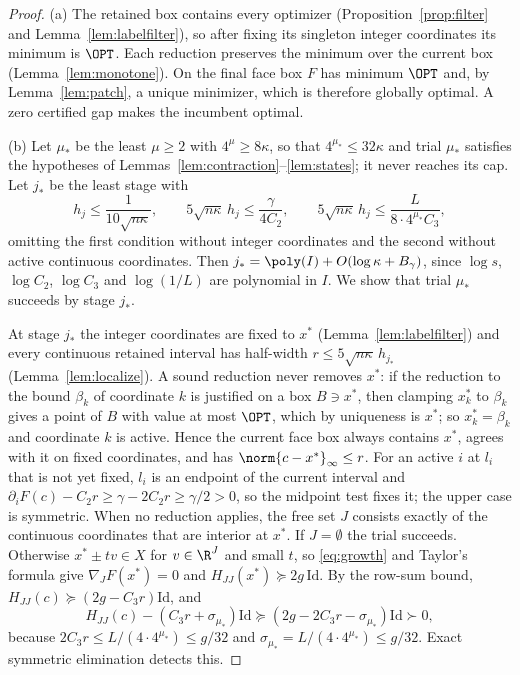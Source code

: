 \begin{proof}
(a) The retained box contains every optimizer
(Proposition~\ref{prop:filter} and Lemma~\ref{lem:labelfilter}), so after
fixing its singleton integer coordinates its minimum is $\OPT$. Each
reduction preserves the minimum over the current box
(Lemma~\ref{lem:monotone}). On the final face box $F$ has minimum $\OPT$ and,
by Lemma~\ref{lem:patch}, a unique minimizer, which is therefore globally
optimal. A zero certified gap makes the incumbent optimal.

(b) Let $\mu_*$ be the least $\mu\ge2$ with $4^\mu\ge8\kappa$, so that
$4^{\mu_*}\le32\kappa$ and trial $\mu_*$ satisfies the hypotheses of
Lemmas~\ref{lem:contraction}--\ref{lem:states}; it never reaches its cap. Let
$j_*$ be the least stage with
\[
h_j\le\frac1{10\sqrt{n\kappa}},\qquad
5\sqrt{n\kappa}\,h_j\le\frac\gamma{4C_2},\qquad
5\sqrt{n\kappa}\,h_j\le\frac L{8\cdot4^{\mu_*}C_3},
\]
omitting the first condition without integer coordinates and the second
without active continuous coordinates. Then
$j_*=\poly(I)+O(\log\kappa+B_\gamma)$, since $\log s$, $\log C_2$, $\log C_3$
and $\log(1/L)$ are polynomial in $I$. We show that trial $\mu_*$ succeeds by
stage $j_*$.

At stage $j_*$ the integer coordinates are fixed to $x^*$
(Lemma~\ref{lem:labelfilter}) and every continuous retained interval has
half-width $r\le5\sqrt{n\kappa}\,h_{j_*}$ (Lemma~\ref{lem:localize}). A sound
reduction never removes $x^*$: if the reduction to the bound $\beta_k$ of
coordinate $k$ is justified on a box $B\ni x^*$, then clamping $x^*_k$ to
$\beta_k$ gives a point of $B$ with value at most $\OPT$, which by uniqueness is
$x^*$; so $x^*_k=\beta_k$ and coordinate $k$ is active. Hence the current
face box always contains $x^*$, agrees with it on fixed coordinates, and has
$\norm{c-x^*}_\infty\le r$. For an active $i$ at $l_i$ that is not yet fixed,
$l_i$ is an endpoint of the current interval and
$\partial_iF(c)-C_2r\ge\gamma-2C_2r\ge\gamma/2>0$, so the midpoint test
fixes it; the upper case is symmetric. When no reduction applies, the free
set $J$ consists exactly of the continuous coordinates that are interior at
$x^*$. If $J=\emptyset$ the trial succeeds. Otherwise $x^*\pm tv\in X$ for
$v\in\R^J$ and small $t$, so \eqref{eq:growth} and Taylor's formula give
$\nabla_JF(x^*)=0$ and $H_{JJ}(x^*)\succeq2g\,\mathrm{Id}$. By the row-sum
bound, $H_{JJ}(c)\succeq(2g-C_3r)\mathrm{Id}$, and
\[
H_{JJ}(c)-(C_3r+\sigma_{\mu_*})\mathrm{Id}\succeq(2g-2C_3r-\sigma_{\mu_*})\mathrm{Id}
\succ0,
\]
because $2C_3r\le L/(4\cdot4^{\mu_*})\le g/32$ and
$\sigma_{\mu_*}=L/(4\cdot4^{\mu_*})\le g/32$. Exact symmetric elimination
detects this.


\end{proof}
